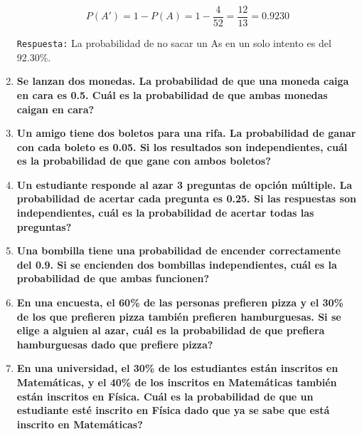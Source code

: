 \documentclass[12pt]{article}
\begin{document}
\begin{enumerate}[label=\textbf{\arabic*.}]
        \[P(A') = 1 - P(A) = 1 - \frac{4}{52} = \frac{12}{13} = 0.9230\]

        \texttt{Respuesta:} La probabilidad de no sacar un As en un solo intento es del 92.30\%.

        \item \textbf{Se lanzan dos monedas. La probabilidad de que una moneda caiga en cara es
        0.5. \textquestiondown Cuál es la probabilidad de que ambas monedas caigan en cara?}
        
        \item \textbf{Un amigo tiene dos boletos para una rifa. La probabilidad de ganar con cada
        boleto es 0.05. Si los resultados son independientes, \textquestiondown cuál es la probabilidad de
        que gane con ambos boletos?}
        
        \item \textbf{Un estudiante responde al azar 3 preguntas de opción múltiple. La probabilidad
        de acertar cada pregunta es 0.25. Si las respuestas son independientes, \textquestiondown cuál es
        la probabilidad de acertar todas las preguntas?}
        
        \item \textbf{Una bombilla tiene una probabilidad de encender correctamente del 0.9. Si se
        encienden dos bombillas independientes, \textquestiondown cuál es la probabilidad de que ambas
        funcionen?}
        
        \item \textbf{En una encuesta, el 60\% de las personas prefieren pizza y el 30\% de los que
        prefieren pizza también prefieren hamburguesas. Si se elige a alguien al azar,
        \textquestiondown cuál es la probabilidad de que prefiera hamburguesas dado que prefiere pizza?}
        
        \item \textbf{En una universidad, el 30\% de los estudiantes están inscritos en Matemáticas, y
        el 40\% de los inscritos en Matemáticas también están inscritos en Física. \textquestiondown Cuál
        es la probabilidad de que un estudiante esté inscrito en Física dado que ya se
        sabe que está inscrito en Matemáticas?}

    \end{enumerate}
\end{document}
